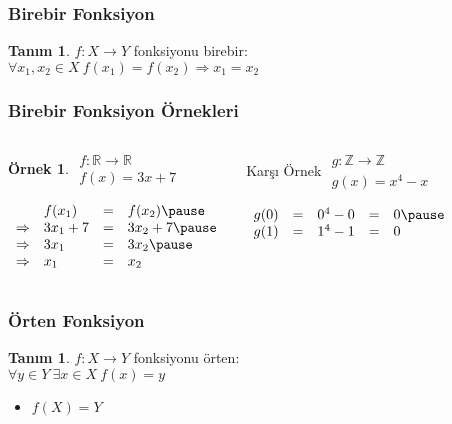 \documentclass[dvipsnames]{beamer}
\theoremstyle{definition}
\newtheorem{tanim}[theorem]{Tanım}
\theoremstyle{example}
\newtheorem{ornek}[theorem]{Örnek}
\theoremstyle{plain}
\begin{document}
\begin{frame}
  \frametitle{Birebir Fonksiyon}

  \begin{tanim}
    $f: X \rightarrow Y$ fonksiyonu \alert{birebir}:\\
      $\forall x_1,x_2 \in X~f(x_1)=f(x_2) \Rightarrow x_1=x_2$
  \end{tanim}
\end{frame}

\begin{frame}
  \frametitle{Birebir Fonksiyon Örnekleri}

  \begin{columns}[t]
    \begin{ornek}
      $\begin{array}{l}
        f: \mathbb{R} \rightarrow \mathbb{R}\\
        f(x) = 3x + 7
      \end{array}$

      \pause
      \bigskip
      $\begin{array}{llll}
                    & f(x_1)    & = & f(x_2)\pause\\
        \Rightarrow & 3 x_1 + 7 & = & 3 x_2 + 7\pause\\
        \Rightarrow & 3 x_1     & = & 3 x_2\pause\\
        \Rightarrow & x_1       & = & x_2
      \end{array}$
    \end{ornek}

    \pause
    \begin{block}{Karşı Örnek}
      $\begin{array}{l}
        g: \mathbb{Z} \rightarrow \mathbb{Z}\\
        g(x) = x^4 - x
      \end{array}$

      \pause
      \bigskip
      $\begin{array}{lllll}
        g(0) & = & 0^4 - 0 & = & 0\pause\\
        g(1) & = & 1^4 - 1 & = & 0
      \end{array}$
    \end{block}
  \end{columns}
\end{frame}

\begin{frame}
  \frametitle{Örten Fonksiyon}

  \begin{tanim}
    $f: X \rightarrow Y$ fonksiyonu \alert{örten}:\\
    $\forall y \in Y~\exists x \in X~f(x)=y$
  \end{tanim}

  \pause
  \begin{itemize}
    \item $f(X)=Y$
  \end{itemize}
\end{frame}
\end{document}
